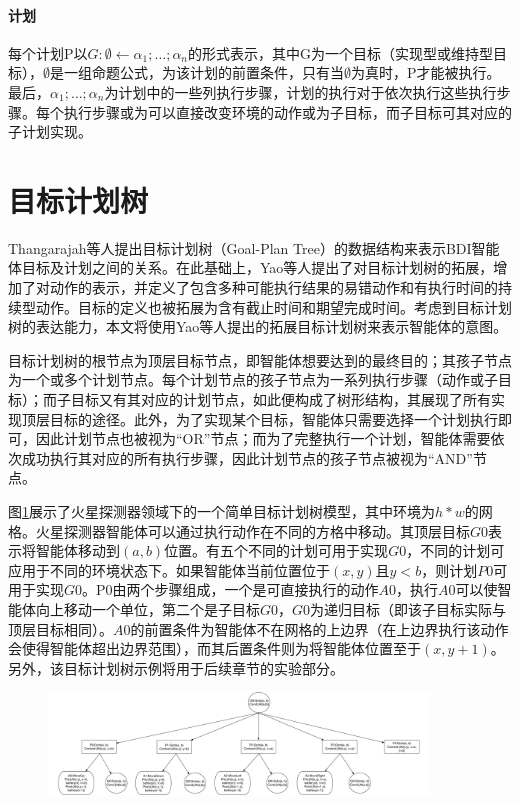 \paragraph{计划}
每个计划P以$G:\emptyset \gets \alpha_1; \dots;\alpha_n$的形式表示，其中G为一个目标（实现型或维持型目标），$\emptyset$是一组命题公式，为该计划的前置条件，只有当$\emptyset$为真时，P才能被执行。最后，$\alpha_1; \dots;\alpha_n$为计划中的一些列执行步骤，计划的执行对于依次执行这些执行步骤。每个执行步骤或为可以直接改变环境的动作或为子目标，而子目标可其对应的子计划实现。

\section{目标计划树}
Thangarajah等人提出目标计划树（Goal-Plan Tree）\cite{DBLP:journals/jar/ThangarajahP11,DBLP:conf/ijcai/ThangarajahPW03,DBLP:conf/ijcai/ThangarajahPW03,DBLP:conf/ecai/ThangarajahWPF02}的数据结构来表示BDI智能体目标及计划之间的关系。在此基础上，Yao等人提出了对目标计划树的拓展\cite{DBLP:conf/atal/YaoSL16}，增加了对动作的表示，并定义了包含多种可能执行结果的易错动作和有执行时间的持续型动作。目标的定义也被拓展为含有截止时间和期望完成时间。考虑到目标计划树的表达能力，本文将使用Yao等人提出的拓展目标计划树来表示智能体的意图。

目标计划树的根节点为顶层目标节点，即智能体想要达到的最终目的；其孩子节点为一个或多个计划节点。每个计划节点的孩子节点为一系列执行步骤（动作或子目标）；而子目标又有其对应的计划节点，如此便构成了树形结构，其展现了所有实现顶层目标的途径。此外，为了实现某个目标，智能体只需要选择一个计划执行即可，因此计划节点也被视为“OR”节点；而为了完整执行一个计划，智能体需要依次成功执行其对应的所有执行步骤，因此计划节点的孩子节点被视为“AND”节点。

图\ref{fig:gpt}展示了火星探测器领域下的一个简单目标计划树模型，其中环境为$h*w$的网格。火星探测器智能体可以通过执行动作在不同的方格中移动。其顶层目标$G0$表示将智能体移动到$(a,b)$位置。有五个不同的计划可用于实现$G0$，不同的计划可应用于不同的环境状态下。如果智能体当前位置位于$(x,y)$且$y < b$，则计划$P0$可用于实现$G0$。P0由两个步骤组成，一个是可直接执行的动作$A0$，执行$A0$可以使智能体向上移动一个单位，第二个是子目标$G0$，$G0$为递归目标（即该子目标实际与顶层目标相同）。$A0$的前置条件为智能体不在网格的上边界（在上边界执行该动作会使得智能体超出边界范围），而其后置条件则为将智能体位置至于$(x,y+1)$。另外，该目标计划树示例将用于后续章节的实验部分。
\begin{figure}[htb]
\centering
\includegraphics[width=0.9\textwidth]{./figs/MarsRover_GPT}
\label{fig:gpt}
\end{figure}

